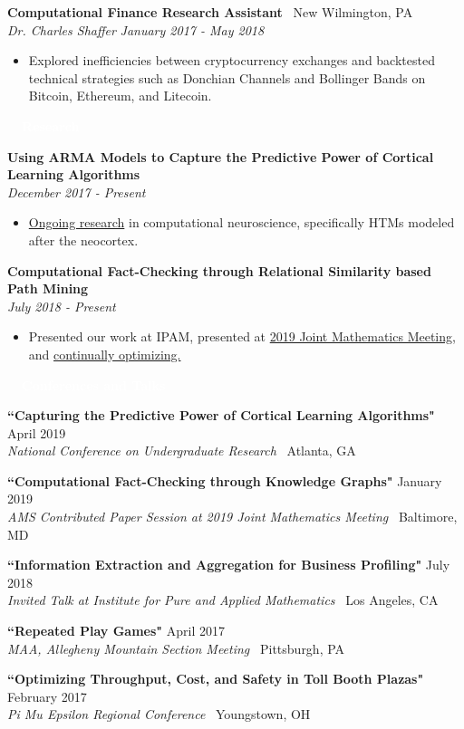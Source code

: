\documentclass[letterpaper,11pt]{article}
\newcommand{\resitem}[1]{\item[--] #1}
\newcommand{\resheading}[1]{{\vspace{2pt}\large \colorbox{electricpurple}{\begin{minipage}{\textwidth}{\textbf{#1 \vphantom{p\^{E}}}}\end{minipage}}}\vspace{8pt}}
\newcommand{\Position}[4]{
	\vspace{-6pt}
	\textbf{#1} \hfill \faMapPin \ #2 \\
	\textit{#3} \hfill \textit{#4} \\
	\vspace{-4pt}
}
\newcommand{\Talk}[4]{
	\textbf{#1} \hfill #2 \\
	\textit{#3} \hfill \faMapMarker \ #4 \\
	\vspace{2pt}
}
\newcommand{\Research}[2]{
	\textbf{#1}\\
	\textit{#2} \\
	\vspace{-3pt}
}
\newenvironment{titemize}{
	\vspace{-6pt}
	\begin{itemize}
		\setlength{\itemsep}{0pt}
		\setlength{\parskip}{0pt}
		\setlength{\topsep}{0pt}
}{\end{itemize}\vspace{-4pt}}
\begin{document}
		\Position{Computational Finance Research Assistant}{New Wilmington, PA}{Dr. Charles Shaffer}{January 2017 - May 2018}
		\begin{titemize}
			\resitem{Explored inefficiencies between cryptocurrency exchanges and backtested technical strategies such as Donchian Channels and Bollinger Bands on Bitcoin, Ethereum, and Litecoin.}
		\end{titemize}

	\resheading{\textcolor{white}{\ \faBook \ Research}}
	
	\Research{Using ARMA Models to Capture the Predictive Power of Cortical Learning Algorithms}{December 2017 - Present}
	\begin{titemize}
		\resitem{\href{https://github.com/alexandermichels/HonorsResearch}{Ongoing research} in computational neuroscience, specifically HTMs modeled after the neocortex.}
	\end{titemize}
	
	\Research{Computational Fact-Checking through Relational Similarity based Path Mining}{July 2018 - Present}
	\begin{titemize}
		\resitem{Presented our work at IPAM, presented at \href{https://jointmathematicsmeetings.org/meetings/national/jmm2019/2217_progfull.html?fbclid=IwAR0AccnUi\_yuX4UdnTVF-cCFVJ5lNYAdIvzw7TPS81eGXk1pn5PvQjaGyTo\#2217:AMSCP33}{2019 Joint Mathematics Meeting}, and \href{https://github.com/himahuja/StreamMiner}{continually optimizing.}}
	\end{titemize}
	
		\resheading{\textcolor{white}{\ \faChalkboardTeacher \ Conferences and Talks}}
		
		\Talk{``Capturing the Predictive Power of Cortical Learning Algorithms"}{April 2019}{National Conference on Undergraduate Research}{Atlanta, GA}
		
		\Talk{``Computational Fact-Checking through Knowledge Graphs"}{January 2019}{AMS Contributed Paper Session at 2019 Joint Mathematics Meeting}{Baltimore, MD}
		
		\Talk{``Information Extraction and Aggregation for Business Profiling"}{July 2018}{Invited Talk at Institute for Pure and Applied Mathematics}{Los Angeles, CA}
		
		\Talk{``Repeated Play Games"}{April 2017}{MAA, Allegheny Mountain Section Meeting}{Pittsburgh, PA}
		
		\Talk{``Optimizing Throughput, Cost, and Safety in Toll Booth Plazas"}{February 2017}{Pi Mu Epsilon Regional Conference}{Youngstown, OH}
\end{document}
